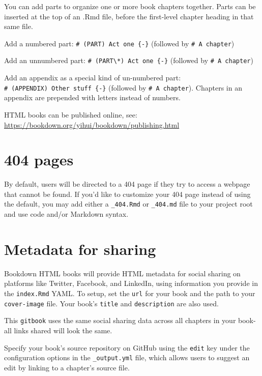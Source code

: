 \documentclass[
]{book}
\theoremstyle{definition}
\theoremstyle{definition}
\theoremstyle{definition}
\theoremstyle{definition}
\theoremstyle{remark}
\begin{document}
You can add parts to organize one or more book chapters together. Parts can be inserted at the top of an .Rmd file, before the first-level chapter heading in that same file.

Add a numbered part: \texttt{\#\ (PART)\ Act\ one\ \{-\}} (followed by \texttt{\#\ A\ chapter})

Add an unnumbered part: \texttt{\#\ (PART\textbackslash{}*)\ Act\ one\ \{-\}} (followed by \texttt{\#\ A\ chapter})

Add an appendix as a special kind of un-numbered part: \texttt{\#\ (APPENDIX)\ Other\ stuff\ \{-\}} (followed by \texttt{\#\ A\ chapter}). Chapters in an appendix are prepended with letters instead of numbers.

HTML books can be published online, see: \url{https://bookdown.org/yihui/bookdown/publishing.html}

\hypertarget{pages}{%
\section{404 pages}\label{pages}}

By default, users will be directed to a 404 page if they try to access a webpage that cannot be found. If you'd like to customize your 404 page instead of using the default, you may add either a \texttt{\_404.Rmd} or \texttt{\_404.md} file to your project root and use code and/or Markdown syntax.

\hypertarget{metadata-for-sharing}{%
\section{Metadata for sharing}\label{metadata-for-sharing}}

Bookdown HTML books will provide HTML metadata for social sharing on platforms like Twitter, Facebook, and LinkedIn, using information you provide in the \texttt{index.Rmd} YAML. To setup, set the \texttt{url} for your book and the path to your \texttt{cover-image} file. Your book's \texttt{title} and \texttt{description} are also used.

This \texttt{gitbook} uses the same social sharing data across all chapters in your book- all links shared will look the same.

Specify your book's source repository on GitHub using the \texttt{edit} key under the configuration options in the \texttt{\_output.yml} file, which allows users to suggest an edit by linking to a chapter's source file.
\end{document}
